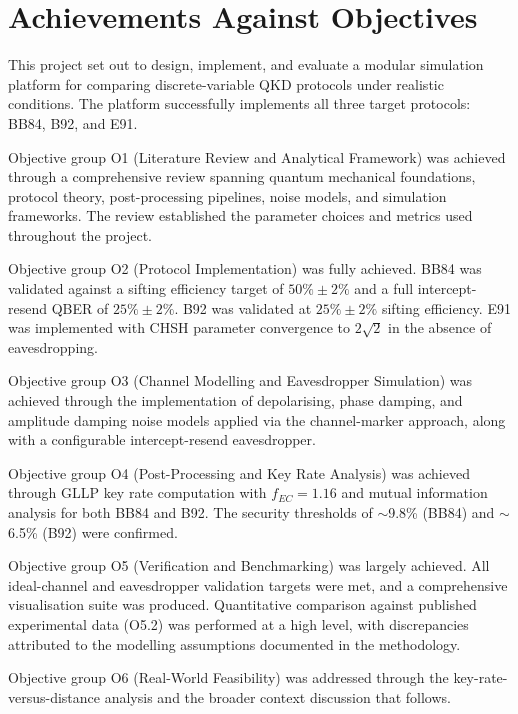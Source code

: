 
\section{Achievements Against Objectives}

This project set out to design, implement, and evaluate a modular simulation platform for comparing discrete-variable QKD protocols under realistic conditions. The platform successfully implements all three target protocols: BB84, B92, and E91.

Objective group O1 (Literature Review and Analytical Framework) was achieved through a comprehensive review spanning quantum mechanical foundations, protocol theory, post-processing pipelines, noise models, and simulation frameworks. The review established the parameter choices and metrics used throughout the project.

Objective group O2 (Protocol Implementation) was fully achieved. BB84 was validated against a sifting efficiency target of $50\% \pm 2\%$ and a full intercept-resend QBER of $25\% \pm 2\%$. B92 was validated at $25\% \pm 2\%$ sifting efficiency. E91 was implemented with CHSH parameter convergence to $2\sqrt{2}$ in the absence of eavesdropping.

Objective group O3 (Channel Modelling and Eavesdropper Simulation) was achieved through the implementation of depolarising, phase damping, and amplitude damping noise models applied via the channel-marker approach, along with a configurable intercept-resend eavesdropper.

Objective group O4 (Post-Processing and Key Rate Analysis) was achieved through GLLP key rate computation with $f_{EC} = 1.16$ and mutual information analysis for both BB84 and B92. The security thresholds of $\sim$9.8\% (BB84) and $\sim$6.5\% (B92) were confirmed.

Objective group O5 (Verification and Benchmarking) was largely achieved. All ideal-channel and eavesdropper validation targets were met, and a comprehensive visualisation suite was produced. Quantitative comparison against published experimental data (O5.2) was performed at a high level, with discrepancies attributed to the modelling assumptions documented in the methodology.

Objective group O6 (Real-World Feasibility) was addressed through the key-rate-versus-distance analysis and the broader context discussion that follows.

